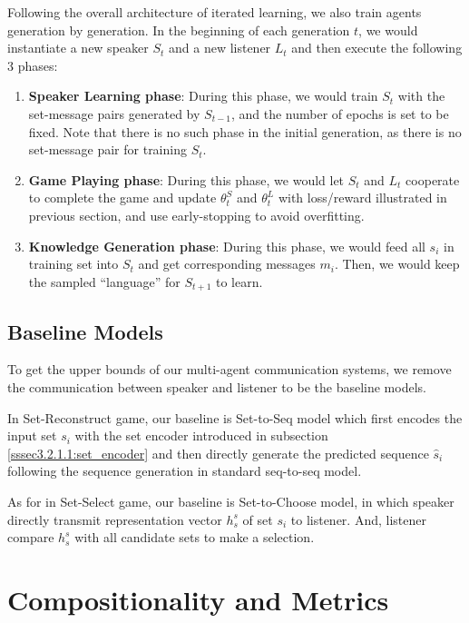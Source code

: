 Following the overall architecture of iterated learning, we also train agents generation by generation. In the beginning of each generation $t$, we would instantiate a new speaker $S_t$ and a new listener $L_t$ and then execute the following 3 phases:

\begin{enumerate}
  \item \textbf{Speaker Learning phase}: During this phase, we would train $S_t$ with the set-message pairs generated by $S_{t-1}$, and the number of epochs is set to be fixed. Note that there is no such phase in the initial generation, as there is no set-message pair for training $S_t$.
  \item \textbf{Game Playing phase}: During this phase, we would let $S_t$ and $L_t$ cooperate to complete the game and update $\theta^S_t$ and $\theta^L_t$ with loss/reward illustrated in previous section, and use early-stopping to avoid overfitting.
  \item \textbf{Knowledge Generation phase}: During this phase, we would feed all $s_i$ in training set into $S_t$ and get corresponding messages $m_i$. Then, we would keep the sampled ``language'' for $S_{t+1}$ to learn.
\end{enumerate}

\subsection{Baseline Models}
\label{ssec3.2.5:baselines}

To get the upper bounds of our multi-agent communication systems, we remove the communication between speaker and listener to be the baseline models.

In Set-Reconstruct game, our baseline is Set-to-Seq model which first encodes the input set $s_i$ with the set encoder introduced in subsection \ref{sssec3.2.1.1:set_encoder} and then directly generate the predicted sequence $\hat{s}_i$ following the sequence generation in standard seq-to-seq model.

As for in Set-Select game, our baseline is Set-to-Choose model, in which speaker directly transmit representation vector $h^s_s$ of set $s_i$ to listener. And, listener compare $h^s_s$ with all candidate sets to make a selection.

\section{Compositionality and Metrics}
\label{sec3.3:metrics}

